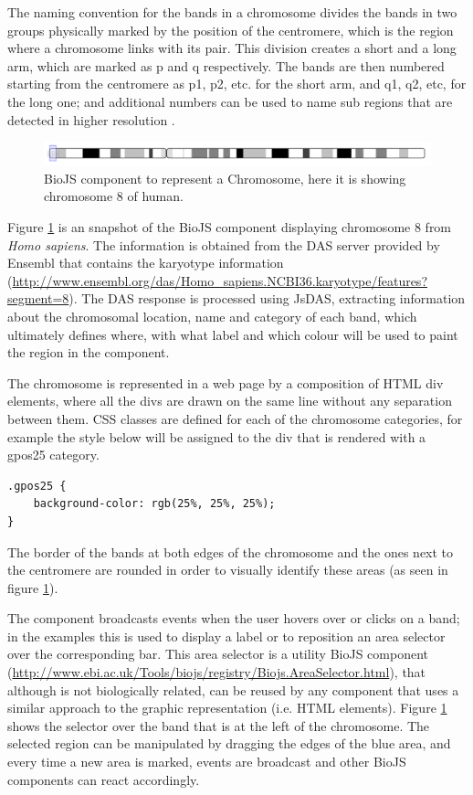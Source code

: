 The naming convention for the bands in a chromosome divides the bands in two groups physically marked by the position of the centromere, which is the region where a chromosome links with its pair. This division creates a short and a long arm, which are marked as p and q respectively. The bands are then numbered starting from the centromere as p1, p2, etc. for the short arm, and q1, q2, etc, for the long one; and additional numbers can be used to name sub regions that are detected in higher resolution \cite{NLM2013}.

\begin{figure}[ht]
\centering
\includegraphics[width=\textwidth]{figures/chromosome.png}
\caption[BioJS component to represent a Chromosome]{BioJS component to represent a Chromosome, here it is showing chromosome 8 of human.
\label{fig:biojs_chromosome}}
\end{figure}

Figure \ref{fig:biojs_chromosome} is an snapshot of the BioJS component displaying chromosome 8 from \emph{Homo sapiens}. The information is obtained from the DAS server provided by Ensembl that contains the karyotype information (\url{http://www.ensembl.org/das/Homo_sapiens.NCBI36.karyotype/features?segment=8}). The DAS response is processed using JsDAS, extracting information about the chromosomal location, name and category of each band, which ultimately defines where, with what label and which colour will be used to paint the region in the component.

The chromosome is represented in a web page by a composition of HTML div elements, where all the divs are drawn on the same line without any separation between them. CSS classes are defined for each of the chromosome categories, for example the style below will be assigned to the div that is rendered with a gpos25 category.

\begin{lstlisting}[language=HTML]
.gpos25 {
	background-color: rgb(25%, 25%, 25%);
}
\end{lstlisting}

The border of the bands at both edges of the chromosome and the ones next to the centromere are rounded in order to visually identify these areas (as seen in figure \ref{fig:biojs_chromosome}).

The component broadcasts events when the user hovers over or clicks on a band; in the examples this is used to display a label or to reposition an area selector over the corresponding bar. This area selector is a utility BioJS component (\url{http://www.ebi.ac.uk/Tools/biojs/registry/Biojs.AreaSelector.html}), that although is not biologically related,  can be reused by any component that uses a similar approach to the graphic representation (i.e. HTML elements). Figure \ref{fig:biojs_chromosome} shows the selector over the band that is at the left of the chromosome. The selected region can be manipulated by dragging the edges of the blue area, and every time a new area is marked, events are broadcast and other BioJS components can react accordingly.


